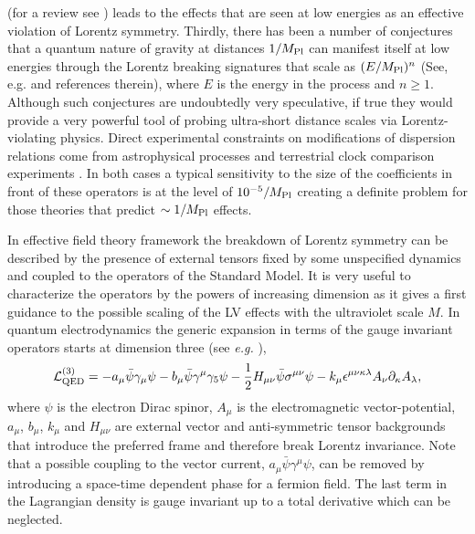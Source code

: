 \documentclass[12pt]{revtex4}
\begin{document}
(for a review see \cite{DN})
leads to the effects that are seen at low energies as an effective 
violation of Lorentz symmetry. Thirdly, there has been a number of 
conjectures that a quantum nature of gravity at distances $1/M_{\rm Pl}$ 
can manifest itself at low energies through the  Lorentz breaking signatures 
that scale as $(E/M_{\rm Pl})^n$ (See, e.g. \cite{lcq} and references therein), 
where $E$ is the energy in 
the process and $n \geq 1$. Although such conjectures are undoubtedly 
very speculative, if true they would provide a very powerful tool of probing 
ultra-short distance scales via Lorentz-violating physics.  Direct experimental constraints on 
modifications of dispersion relations come from astrophysical processes 
\cite{CFJ,AmC,Ted1,GK,Kost2,Sarkar} and terrestrial 
clock comparison experiments \cite{clock1,clock2,Vuc,MP:}. In both cases a
typical sensitivity to the size of the coefficients in 
front of these operators is at the level of $10^{-5}/M_{\rm Pl}$ creating 
a definite problem for those theories that predict $\sim 1/M_{\rm Pl}$ effects.

In effective field theory framework the breakdown of Lorentz 
symmetry can be described by the presence of external tensors fixed 
by some unspecified dynamics and coupled to the operators of the
Standard Model. It is very useful to characterize the operators by the powers 
of increasing dimension as it gives a first guidance to the 
possible scaling of the LV effects with the ultraviolet scale $M$. 
In quantum electrodynamics the generic expansion
in terms of the gauge invariant operators starts at dimension three (see {\em e.g.}
\cite{Kost1}),
\begin{equation}
{\cal L}_{\rm QED}^{(3)} =
-a_\mu \bar \psi \gamma_\mu \psi
- b_\mu \bar \psi \gamma^\mu \gamma_5 \psi - \frac{1}{2}H_{\mu\nu}\bar
\psi \sigma^{\mu\nu} \psi - k_\mu \epsilon^{\mu\nu\kappa\lambda}
A_\nu \partial_\kappa A_\lambda, 
\label{LVqed}
\end{equation}
where $\psi$ is the electron Dirac spinor, $A_\mu$ is the
electromagnetic vector-potential, $a_{\mu}$,
$b_\mu$, $k_\mu$ and $H_{\mu\nu}$ are external vector and
anti-symmetric tensor backgrounds that introduce the preferred
frame and therefore break Lorentz invariance. Note that a possible
coupling to the vector current, $a_\mu \bar \psi \gamma^\mu \psi$,
can be removed by introducing a space-time dependent phase for a
fermion field. The last term in the Lagrangian density is gauge
invariant up to a total derivative which can be neglected. 
\end{document}
